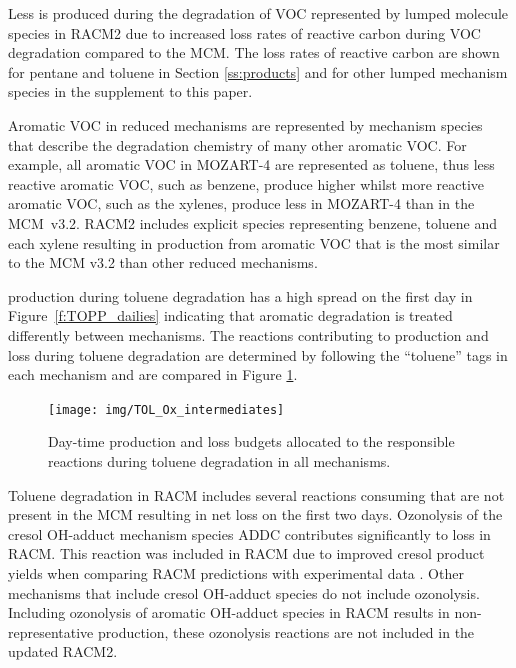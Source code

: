 Less  is produced during the degradation of VOC represented by lumped molecule species in RACM2 due to increased loss rates of reactive carbon during VOC degradation compared to the MCM.
The loss rates of reactive carbon are shown for pentane and toluene in Section \ref{ss:products} and for other lumped mechanism species in the supplement to this paper. 

Aromatic VOC in reduced mechanisms are represented by mechanism species that describe the degradation chemistry of many other aromatic VOC.
For example, all aromatic VOC in MOZART-4 are represented as toluene, thus less reactive aromatic VOC, such as benzene, produce higher  whilst more reactive aromatic VOC, such as the xylenes, produce less  in MOZART-4 than in the \mbox{MCM v3.2}.
RACM2 includes explicit species representing benzene, toluene and each xylene resulting in  production from aromatic VOC that is the most similar to the MCM v3.2 than other reduced mechanisms.

 production during toluene degradation has a high spread on the first day in \mbox{Figure \ref{f:TOPP_dailies}} indicating that aromatic degradation is treated differently between mechanisms.
The reactions contributing to  production and loss during toluene degradation are determined by following the ``toluene'' tags in each mechanism and are compared in Figure \ref{f:toluene_Ox}.

\begin{figure}
    \centering
    \texttt{[image: img/TOL\_Ox\_intermediates]}
    \vspace{0mm}
    \caption{Day-time  production and loss budgets allocated to the responsible reactions during toluene degradation in all mechanisms.}
    \vspace{-4mm}
    \label{f:toluene_Ox}
\end{figure}

Toluene degradation in RACM includes several reactions consuming  that are not present in the MCM resulting in net  loss on the first two days.
Ozonolysis of the cresol OH-adduct mechanism species ADDC contributes significantly to  loss in RACM.
This reaction was included in RACM due to improved cresol product yields when comparing RACM predictions with experimental data \citep{Stockwell:1997}. 
Other mechanisms that include cresol OH-adduct species do not include ozonolysis.
Including ozonolysis of aromatic OH-adduct species in RACM results in non-representative  production, these ozonolysis reactions are not included in the updated RACM2.

